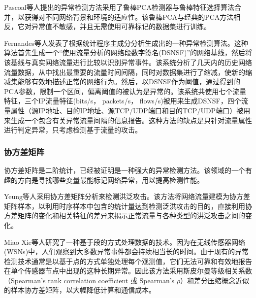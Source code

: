 Pascoal等人\cite{pascoal2012robust}提出的异常检测方法采用了鲁棒PCA检测器与鲁棒特征选择算法合并，以获得对不同网络背景和环境的适应性。该鲁棒PCA与经典的PCA方法相反，它对异常值不敏感，并且无需使用可靠标记的数据集进行训练。

Fernandes等人\cite{fernandes2016network}发表了根据统计程序主成分分析生成出的一种异常检测算法。这种算法首先生成一个“使用流量分析的网络段数字签名(DSNSF)”的网络基线，然后将该基线与真实网络流量进行比较以识别异常事件。该系统分析了几天内的历史网络流量数据，从中找出最重要的流量时间间隔，同时对数据集进行了缩减，使新的缩减集能够有效地描述正常的网络行为。然后，以DSNSF作为阈值，通过得到的PCA参数，限制一个区间，偏离阈值的被认为是异常的。该系统共使用七个流量特征，三个IP流量特征(bits/s， packets/s， flows/s)被用来生成DSNSF，四个流量属性（源IP地址、目的IP地址、源TCP/UDP端口和目的TCP/UDP端口）被用来生成一个包含有关异常流量间隔的信息报告。这种方法的缺点是只针对流量属性进行判定异常，只考虑检测基于流量的攻击。


\subsubsection{协方差矩阵}

协方差矩阵是二阶统计，已经被证明是一种强大的异常检测方法。该领域的一个有趣的方向是寻找哪些变量最能标记网络异常，用以提高检测性能。

Yeung等人\cite{yeung2007covariance}采用协方差矩阵分析来检测洪泛攻击。该方法将网络流量建模为协方差矩阵样本，以利用时序样本中包含的统计量达到检测泛洪攻击的目的，直接利用协方差矩阵的变化和相关特征的差异来揭示正常流量与各种类型的洪泛攻击之间的变化。


 Miao Xie等人\cite{xie2014segment}研究了一种基于段的方式处理数据的技术。因为在无线传感器网络(WSNs)中，人们观察到大多数异常事件都会持续相当长的时间。由于现有的异常检测技术通常是以基于点的方式单独处理每个观测值，它们无法可靠和有效地报告在单个传感器节点中出现的这种长期异常。因此该方法采用斯皮尔曼等级相关系数（Spearman's rank correlation coefficient 或 Spearman's $\rho$）和差分压缩概念近似的样本协方差矩阵，以大幅降低计算和通信成本。








